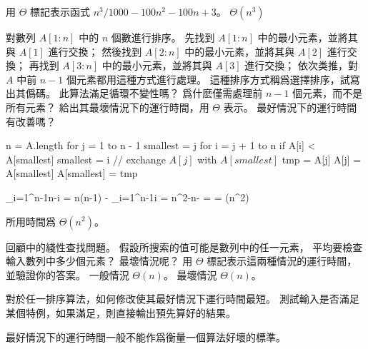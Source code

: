 \startsection[
  title={Analyzing algorithms},
]

\startEXERCISE
用 $\Theta$ 標記表示函式 $n^3 / 1000 - 100 n^2 - 100 n + 3$。
\stopEXERCISE
\startANSWER
$\Theta(n^3)$
\stopANSWER

對數列 $A[1:n]$ 中的 $n$ 個數進行排序。
先找到 $A[1:n]$ 中的最小元素，並將其與 $A[1]$ 進行交換；
然後找到 $A[2:n]$ 中的最小元素，並將其與 $A[2]$ 進行交換；
再找到 $A[3:n]$ 中的最小元素，並將其與 $A[3]$ 進行交換；
依次类推，對 $A$ 中前 $n-1$ 個元素都用這種方式進行處理。
這種排序方式稱爲{\EMP 選擇排序}，試寫出其僞碼。
此算法滿足循環不變性嗎？
爲什麽僅需處理前 $n-1$ 個元素，而不是所有元素？
給出其最壞情況下的運行時間，用 $\Theta$ 表示。
最好情況下的運行時間有改善嗎？
\stopEXERCISE

\startANSWER
\startCLRSCODE
n = A.length
for j = 1 to n - 1
	smallest = j
	for i = j + 1 to n
		if A[i] < A[smallest]
			smallest = i
	// exchange $A[j]$ with $A[smallest]$
	tmp = A[j]
	A[j] = A[smallest]
	A[smallest] = tmp
\stopCLRSCODE

\startformula
\startmathalignment[n=2]
\NC \NC\sum_{i=1}^{n-1}n-i \NR
\NC = \NC n(n-1) - \sum_{i=1}^{n-1}i \NR
\NC = \NC n^2-n- \NR
\NC = \NC {} \NR
\NC = \NC \Theta(n^2) \NR
\stopmathalignment
\stopformula

所用時間爲 $\Theta(n^2)$。
\stopANSWER

\startEXERCISE
回顧中的綫性查找問題。
假設所搜索的值可能是數列中的任一元素，
平均要檢查輸入數列中多少個元素？
最壞情況呢？
用 $\Theta$ 標記表示這兩種情況的運行時間，
並驗證你的答案。
\stopEXERCISE
\startANSWER
一般情況 $\Theta(n)$。
最壞情況 $\Theta(n)$。
\stopANSWER

\startEXERCISE
對於任一排序算法，如何修改使其最好情況下運行時間最短。
\stopEXERCISE
\startANSWER
測試輸入是否滿足某個特例，如果滿足，則直接輸出預先算好的結果。

最好情況下的運行時間一般不能作爲衡量一個算法好壞的標準。
\stopANSWER

\stopsection
